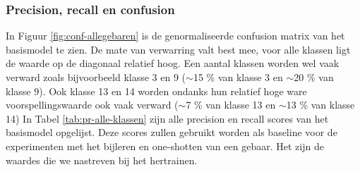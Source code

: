 \subsubsection{Precision, recall en confusion}

\npar In Figuur \ref{fig:conf-allegebaren} is de genormaliseerde confusion matrix van het basismodel te zien. De mate van verwarring valt best mee, voor alle klassen ligt de waarde op de diagonaal relatief hoog. Een aantal klassen worden wel vaak verward zoals bijvoorbeeld klasse 3 en 9 ($\sim$15 \% van klasse 3 en $\sim$20 \% van klasse 9). Ook klasse 13 en 14 worden ondanks hun relatief hoge ware voorspellingswaarde ook vaak verward ($\sim$7 \% van klasse 13 en $\sim$13 \% van klasse 14)
\npar In Tabel \ref{tab:pr-alle-klassen} zijn alle precision en recall scores van het basismodel opgelijst. Deze scores zullen gebruikt worden als baseline voor de experimenten met het bijleren en one-shotten van een gebaar. Het zijn de waardes die we nastreven bij het hertrainen.
